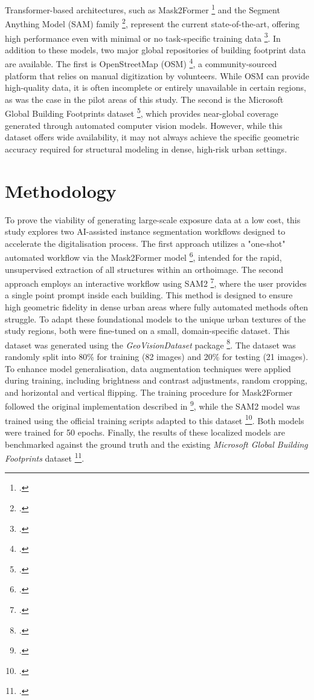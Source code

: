\begin{refsection}
Transformer-based architectures, such as Mask2Former \footcite{cheng_masked-attention_2022} and the Segment Anything Model (SAM) family \footcite{ravi_sam_2024}, represent the current state-of-the-art, offering high performance even with minimal or no task-specific training data \footcite{cao_feasibility_2023}. In addition to these models, two major global repositories of building footprint data are available. The first is OpenStreetMap (OSM) \footcite{haklay_openstreetmap_2008}, a community-sourced platform that relies on manual digitization by volunteers. While OSM can provide high-quality data, it is often incomplete or entirely unavailable in certain regions, as was the case in the pilot areas of this study. The second is the Microsoft Global Building Footprints dataset \footcite{microsoft_globalmlbuildingfootprints_2024}, which provides near-global coverage generated through automated computer vision models. However, while this dataset offers wide availability, it may not always achieve the specific geometric accuracy required for structural modeling in dense, high-risk urban settings.

\renewcommand{\sectionnametext}{Methodology}
\renewcommand{\headingtextL}{\shortchapternametext}
\renewcommand{\headingtextR}{\thesection. \sectionnametext}
\section{\sectionnametext}

 To prove the viability of generating large-scale exposure data at a low cost, this study explores two AI-assisted instance segmentation workflows designed to accelerate the digitalisation process.
The first approach utilizes a "one-shot" automated workflow via the Mask2Former model \footcite{cheng_masked-attention_2022}, intended for the rapid, unsupervised extraction of all structures within an orthoimage. The second approach employs an interactive workflow using SAM2 \footcite{ravi_sam_2024}, where the user provides a single point prompt inside each building. This method is designed to ensure high geometric fidelity in dense urban areas where fully automated methods often struggle.
To adapt these foundational models to the unique urban textures of the study regions, both were fine-tuned on a small, domain-specific dataset. This dataset was generated using the \textit{GeoVisionDataset} package \footcite{urena_pliego_transport-related_2025}. The dataset was randomly split into 80\% for training (82 images) and 20\% for testing (21 images). To enhance model generalisation, data augmentation techniques were applied during training, including brightness and contrast adjustments, random cropping, and horizontal and vertical flipping. The training procedure for Mask2Former followed the original implementation described in \footcite{cheng_masked-attention_2022}, while the SAM2 model was trained using the official training scripts adapted to this dataset \footcite{ravi_sam_2024}. Both models were trained for 50 epochs. Finally, the results of these localized models are benchmarked against the ground truth and the existing \textit{Microsoft Global Building Footprints} dataset \footcite{microsoft_globalmlbuildingfootprints_2024}.


\end{refsection}
